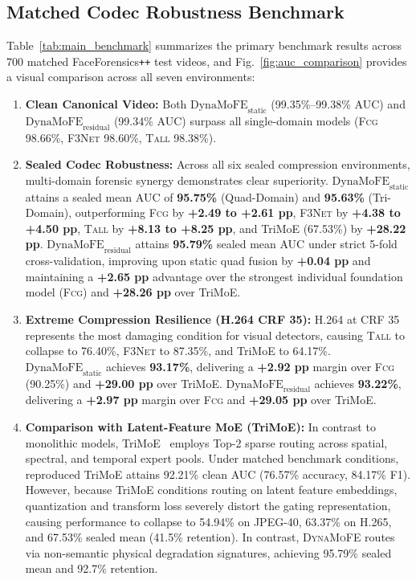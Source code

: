 \documentclass[conference]{IEEEtran}
\newcommand{\tall}{\textsc{Tall}}
\newcommand{\fcg}{\textsc{Fcg}}
\newcommand{\fthreenet}{\textsc{F3Net}}
\newcommand{\dynamofe}{\textsc{DynaMoFE}}
\newcommand{\ffpp}{FaceForensics\texttt{++}}
\newcommand{\auc}{AUC}
\newcommand{\pp}{pp}
\begin{document}
\subsection{Matched Codec Robustness Benchmark}
Table~\ref{tab:main_benchmark} summarizes the primary benchmark results across 700 matched \ffpp{} test videos, and Fig.~\ref{fig:auc_comparison} provides a visual comparison across all seven environments:
\begin{enumerate}
    \item \textbf{Clean Canonical Video:} Both $\text{DynaMoFE}_{\text{static}}$ (99.35\%--99.38\% \auc{}) and $\text{DynaMoFE}_{\text{residual}}$ (99.34\% \auc{}) surpass all single-domain models (\fcg{} 98.66\%, \fthreenet{} 98.60\%, \tall{} 98.38\%).
    \item \textbf{Sealed Codec Robustness:} Across all six sealed compression environments, multi-domain forensic synergy demonstrates clear superiority. $\text{DynaMoFE}_{\text{static}}$ attains a sealed mean \auc{} of \textbf{95.75\%} (Quad-Domain) and \textbf{95.63\%} (Tri-Domain), outperforming \fcg{} by \textbf{+2.49 to +2.61 \pp{}}, \fthreenet{} by \textbf{+4.38 to +4.50 \pp{}}, \tall{} by \textbf{+8.13 to +8.25 \pp{}}, and TriMoE (67.53\%) by \textbf{+28.22 \pp{}}. $\text{DynaMoFE}_{\text{residual}}$ attains \textbf{95.79\%} sealed mean \auc{} under strict 5-fold cross-validation, improving upon static quad fusion by \textbf{+0.04 \pp{}} and maintaining a \textbf{+2.65 \pp{}} advantage over the strongest individual foundation model (\fcg{}) and \textbf{+28.26 \pp{}} over TriMoE.
    \item \textbf{Extreme Compression Resilience (H.264 CRF 35):} H.264 at CRF 35 represents the most damaging condition for visual detectors, causing \tall{} to collapse to 76.40\%, \fthreenet{} to 87.35\%, and TriMoE to 64.17\%. $\text{DynaMoFE}_{\text{static}}$ achieves \textbf{93.17\%}, delivering a \textbf{+2.92 \pp{}} margin over \fcg{} (90.25\%) and \textbf{+29.00 \pp{}} over TriMoE. $\text{DynaMoFE}_{\text{residual}}$ achieves \textbf{93.22\%}, delivering a \textbf{+2.97 \pp{}} margin over \fcg{} and \textbf{+29.05 \pp{}} over TriMoE.
    \item \textbf{Comparison with Latent-Feature MoE (TriMoE):} In contrast to monolithic models, TriMoE~\cite{dutta2026trimoe} employs Top-2 sparse routing across spatial, spectral, and temporal expert pools. Under matched benchmark conditions, reproduced TriMoE attains 92.21\% clean \auc{} (76.57\% accuracy, 84.17\% F1). However, because TriMoE conditions routing on latent feature embeddings, quantization and transform loss severely distort the gating representation, causing performance to collapse to 54.94\% on JPEG-40, 63.37\% on H.265, and 67.53\% sealed mean (41.5\% retention). In contrast, \dynamofe{} routes via non-semantic physical degradation signatures, achieving 95.79\% sealed mean and 92.7\% retention.
\end{enumerate}
\end{document}
